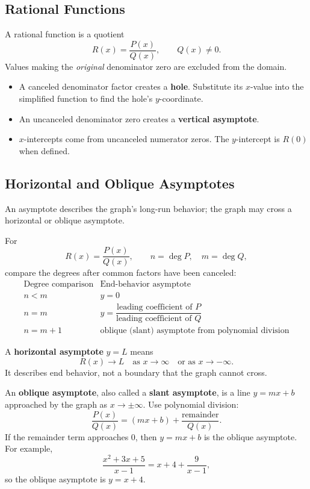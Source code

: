 \documentclass[12pt]{article}
\begin{document}
\subsection*{Rational Functions}
A rational function is a quotient
\[
  R(x)=\frac{P(x)}{Q(x)},\qquad Q(x)\ne0.
\]
Values making the \emph{original} denominator zero are excluded from the domain.

\begin{itemize}[leftmargin=1.5em,itemsep=0.2em]
  \item A canceled denominator factor creates a \textbf{hole}. Substitute its $x$-value into the simplified function to find the hole's $y$-coordinate.
  \item An uncanceled denominator zero creates a \textbf{vertical asymptote}.
  \item $x$-intercepts come from uncanceled numerator zeros. The $y$-intercept is $R(0)$ when defined.
\end{itemize}

\subsection*{Horizontal and Oblique Asymptotes}
An asymptote describes the graph's long-run behavior; the graph may cross a horizontal or oblique asymptote.

For
\[
  R(x)=\frac{P(x)}{Q(x)},
  \qquad n=\deg P,\quad m=\deg Q,
\]
compare the degrees after common factors have been canceled:
\[
\begin{array}{c|c}
\text{Degree comparison} & \text{End-behavior asymptote}\\ \hline
n<m & y=0\\
n=m & y=\dfrac{\text{leading coefficient of }P}
                 {\text{leading coefficient of }Q}\\
n=m+1 & \text{oblique (slant) asymptote from polynomial division}
\end{array}
\]

A \textbf{horizontal asymptote} $y=L$ means
\[
  R(x)\to L \quad\text{as }x\to\infty
  \quad\text{or as }x\to-\infty.
\]
It describes end behavior, not a boundary that the graph cannot cross.

An \textbf{oblique asymptote}, also called a \textbf{slant asymptote}, is a line $y=mx+b$ approached by the graph as $x\to\pm\infty$. Use polynomial division:
\[
  \frac{P(x)}{Q(x)}=(mx+b)+\frac{\text{remainder}}{Q(x)}.
\]
If the remainder term approaches $0$, then $y=mx+b$ is the oblique asymptote. For example,
\[
  \frac{x^2+3x+5}{x-1}=x+4+\frac9{x-1},
\]
so the oblique asymptote is $y=x+4$.
\end{document}
